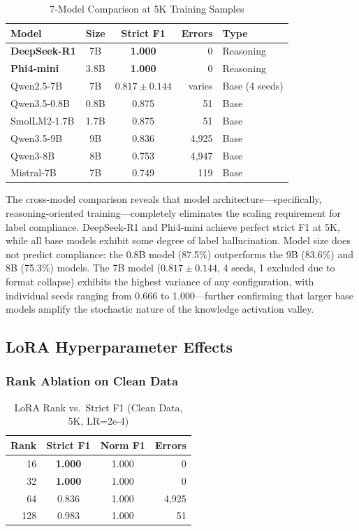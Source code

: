 \documentclass[review,3p]{elsarticle}
\begin{document}
\begin{table}[!ht]
\centering
\caption{7-Model Comparison at 5K Training Samples}
\label{tab:crossmodel}
\begin{tabular}{lccrl}
\toprule
\textbf{Model} & \textbf{Size} & \textbf{Strict F1} & \textbf{Errors} & \textbf{Type} \\
\midrule
\textbf{DeepSeek-R1} & 7B & \textbf{1.000} & 0 & Reasoning \\
\textbf{Phi4-mini} & 3.8B & \textbf{1.000} & 0 & Reasoning \\
Qwen2.5-7B & 7B & $0.817 \pm 0.144$ & varies & Base (4 seeds) \\
Qwen3.5-0.8B & 0.8B & 0.875 & 51 & Base \\
SmolLM2-1.7B & 1.7B & 0.875 & 51 & Base \\
Qwen3.5-9B & 9B & 0.836 & 4,925 & Base \\
Qwen3-8B & 8B & 0.753 & 4,947 & Base \\
Mistral-7B & 7B & 0.749 & 119 & Base \\
\bottomrule
\end{tabular}
\end{table}

The cross-model comparison reveals that model architecture---specifically, reasoning-oriented training---completely eliminates the scaling requirement for label compliance. DeepSeek-R1 and Phi4-mini achieve perfect strict F1 at 5K, while all base models exhibit some degree of label hallucination. Model size does not predict compliance: the 0.8B model (87.5\%) outperforms the 9B (83.6\%) and 8B (75.3\%) models. The 7B model ($0.817 \pm 0.144$, 4 seeds, 1 excluded due to format collapse) exhibits the highest variance of any configuration, with individual seeds ranging from 0.666 to 1.000---further confirming that larger base models amplify the stochastic nature of the knowledge activation valley.

\subsection{LoRA Hyperparameter Effects}

\subsubsection{Rank Ablation on Clean Data}

\begin{table}[!ht]
\centering
\caption{LoRA Rank vs.\ Strict F1 (Clean Data, 5K, LR=2e-4)}
\label{tab:rank-clean}
\begin{tabular}{rccr}
\toprule
\textbf{Rank} & \textbf{Strict F1} & \textbf{Norm F1} & \textbf{Errors} \\
\midrule
16 & \textbf{1.000} & 1.000 & 0 \\
32 & \textbf{1.000} & 1.000 & 0 \\
64 & 0.836 & 1.000 & 4,925 \\
128 & 0.983 & 1.000 & 51 \\
\bottomrule
\end{tabular}
\end{table}
\end{document}
